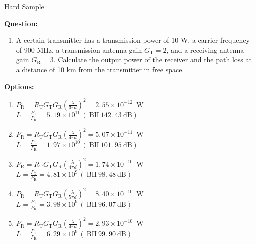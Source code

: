 \begin{hardbox}{Hard Sample}


\textbf{Question:}
\begin{enumerate}[leftmargin=0.5cm, label={}]  
    \item A certain transmitter has a transmission power of 10 W, a carrier frequency of 900 MHz, a transmission antenna gain \( G_{\mathrm{T}}=2 \), and a receiving antenna gain \( G_{\mathrm{R}}=3 \). Calculate the output power of the receiver and the path loss at a distance of 10 km from the transmitter in free space.
\end{enumerate}

\textbf{Options:}
\begin{enumerate}[leftmargin=1cm, label=\Alph*)]  
    \item \( P_{\mathrm{R}}=R_{\mathrm{T}} G_{\mathrm{T}} G_{\mathrm{R}} \left( \frac{\lambda} {3 \pi d} \right)^{2}=2. \, 5 5 \times1 0^{-1 2} \, \, \, \mathrm{W} \) \\
          \( L={\frac{P_{\mathrm{T}}} {P_{\mathrm{R}}}}=5. \, 1 9 \times1 0^{1 1} \, ( \mathrm{~ B I I ~ 1 4 2. ~ 4 3 ~ d B} ) \)
    \item \( P_{\mathrm{R}}=R_{\mathrm{T}} G_{\mathrm{T}} G_{\mathrm{R}} \left( \frac{\lambda} {4 \pi d} \right)^{2}=5. \, 0 7 \times1 0^{-1 1} \, \, \, \mathrm{W} \) \\
          \( L={\frac{P_{\mathrm{T}}} {P_{\mathrm{R}}}}=1. \, 9 7 \times1 0^{1 0} \, ( \mathrm{~ B I I ~ 1 0 1. ~ 9 5 ~ d B} ) \)
    \item \( P_{\mathrm{R}}=R_{\mathrm{T}} G_{\mathrm{T}} G_{\mathrm{R}} \left( \frac{\lambda} {4 \pi d} \right)^{2}=1. \, 7 4 \times1 0^{-1 0} \, \, \, \mathrm{W} \) \\
          \( L={\frac{P_{\mathrm{T}}} {P_{\mathrm{R}}}}=4. \, 8 1 \times1 0^{9} \, ( \mathrm{~ B I I ~ 9 8. ~ 4 8 ~ d B} ) \)
    \item \( P_{\mathrm{R}}=R_{\mathrm{T}} G_{\mathrm{T}} G_{\mathrm{R}} \left( \frac{\lambda} {5 \pi d} \right)^{2}=8. \, 4 0 \times1 0^{-1 0} \, \, \, \mathrm{W} \) \\
          \( L={\frac{P_{\mathrm{T}}} {P_{\mathrm{R}}}}=3. \, 9 8 \times1 0^{9} \, ( \mathrm{~ B I I ~ 9 6. ~ 0 7 ~ d B} ) \)
    \item \( P_{\mathrm{R}}=R_{\mathrm{T}} G_{\mathrm{T}} G_{\mathrm{R}} \left( \frac{\lambda} {4 \pi d} \right)^{2}=2. \, 9 3 \times1 0^{-1 0} \, \, \, \mathrm{W} \) \\
          \( L={\frac{P_{\mathrm{T}}} {P_{\mathrm{R}}}}=6. \, 2 9 \times1 0^{9} \, ( \mathrm{~ B I I ~ 9 9. ~ 9 0 ~ d B} ) \)

\end{enumerate}
\end{hardbox}
